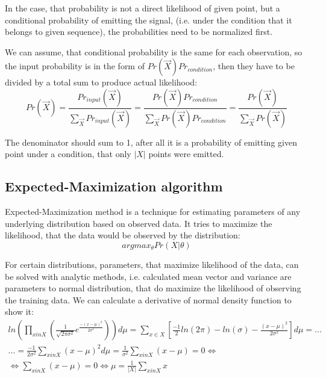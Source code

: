 \documentclass[12pt,a4paper,english]{article}
\begin{document}
In the case, that probability is not a direct likelihood of given point, but a conditional probability of emitting the signal,
(i.e. under the condition that it belongs to given sequence), the probabilities need to be normalized first. \newline

We can assume, that conditional probability is the same for each observation,
 so the input probability is in the form of $ Pr(\vec X) Pr_{condition}$,
then they have to be divided by a total sum to produce actual likelihood:
\begin{equation}
    Pr(\vec X) = \frac{Pr_{input}(\vec X)}{\sum_{\vec X} Pr_{input}(\vec X)} = \frac{Pr(\vec X) Pr_{condition}}{\sum_{\vec X} Pr(\vec X) Pr_{condition}} = 
\frac{Pr(\vec X)}{\sum_{\vec X} Pr(\vec X)}
\end{equation}

The denominator should sum to 1, after all it is a probability of emitting given point under a condition, that only $|X|$ points were emitted.

\newpage
\subsection{Expected-Maximization algorithm}

Expected-Maximization method is a technique for estimating parameters of any underlying distribution based on observed data. It tries to maximize the likelihood, that the data would be observed by the distribution: 
\begin{equation}
    argmax_{\theta} Pr(X | \theta)
\end{equation}

For certain distributions, parameters, that maximize likelihood of the data, can be solved with analytic methods, i.e. calculated mean vector and variance are parameters to normal distribution, that do maximize the likelihood of observing the training data. \newline
We can calculate a derivative of normal density function to show it:
\begin{multline}
    ln(\prod_{x in X} (\frac 1 {\sqrt{2\pi\sigma^2}} e^{\frac{-(x-\mu)^2}{2\sigma^2}}))d\mu  = \sum_{x \in X}[\frac{-1} 2 ln(2\pi)-ln(\sigma)- \frac{(x-\mu)^2} {2 \sigma^2} ]d\mu = ... \\
    ...= \frac {-1} {2 \sigma^2} \sum_{x in X}{(x-\mu)^2}d\mu = \frac 1 {\sigma^2} \sum_{x in X}{(x-\mu)}=0 \iff \\
    \iff \sum_{x in X}{(x-\mu)}=0 \iff \mu = \frac 1 {|X|} \sum_{x in X}x
\end{multline}
\end{document}
